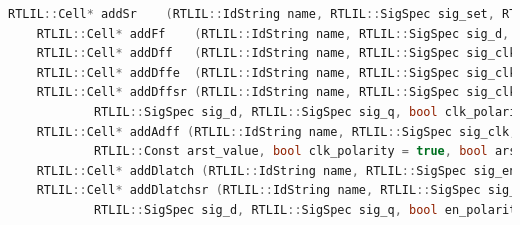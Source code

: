 \documentclass[11pt]{report}
\begin{document}
\begin{lstlisting}[language=C++]
	RTLIL::Cell* addSr    (RTLIL::IdString name, RTLIL::SigSpec sig_set, RTLIL::SigSpec sig_clr, RTLIL::SigSpec sig_q, bool set_polarity = true, bool clr_polarity = true, const std::string &src = "");
	RTLIL::Cell* addFf    (RTLIL::IdString name, RTLIL::SigSpec sig_d, RTLIL::SigSpec sig_q, const std::string &src = "");
	RTLIL::Cell* addDff   (RTLIL::IdString name, RTLIL::SigSpec sig_clk, RTLIL::SigSpec sig_d,   RTLIL::SigSpec sig_q, bool clk_polarity = true, const std::string &src = "");
	RTLIL::Cell* addDffe  (RTLIL::IdString name, RTLIL::SigSpec sig_clk, RTLIL::SigSpec sig_en,  RTLIL::SigSpec sig_d, RTLIL::SigSpec sig_q, bool clk_polarity = true, bool en_polarity = true, const std::string &src = "");
	RTLIL::Cell* addDffsr (RTLIL::IdString name, RTLIL::SigSpec sig_clk, RTLIL::SigSpec sig_set, RTLIL::SigSpec sig_clr,
			RTLIL::SigSpec sig_d, RTLIL::SigSpec sig_q, bool clk_polarity = true, bool set_polarity = true, bool clr_polarity = true, const std::string &src = "");
	RTLIL::Cell* addAdff (RTLIL::IdString name, RTLIL::SigSpec sig_clk, RTLIL::SigSpec sig_arst, RTLIL::SigSpec sig_d, RTLIL::SigSpec sig_q,
			RTLIL::Const arst_value, bool clk_polarity = true, bool arst_polarity = true, const std::string &src = "");
	RTLIL::Cell* addDlatch (RTLIL::IdString name, RTLIL::SigSpec sig_en, RTLIL::SigSpec sig_d, RTLIL::SigSpec sig_q, bool en_polarity = true, const std::string &src = "");
	RTLIL::Cell* addDlatchsr (RTLIL::IdString name, RTLIL::SigSpec sig_en, RTLIL::SigSpec sig_set, RTLIL::SigSpec sig_clr,
			RTLIL::SigSpec sig_d, RTLIL::SigSpec sig_q, bool en_polarity = true, bool set_polarity = true, bool clr_polarity = true, const std::string &src = "");


\end{lstlisting}
\end{document}
